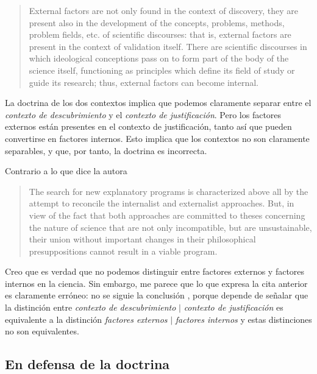 \begin{quote}

	External factors are not only found in the context of discovery, they are present also in the development of the concepts, problems, methods, problem fields, etc. of scientific discourses: that is, external factors are present in the context of validation itself.
	There are scientific discourses in which ideological conceptions pass on to form part of the body of the science itself, functioning as principles which define its field of study or guide its research; thus, external factors can become internal.

\end{quote}

La doctrina de los dos contextos implica que podemos claramente separar entre el \emph{contexto de descubrimiento} y el \emph{contexto de justificación}.
Pero los factores externos están presentes en el contexto de justificación, tanto así que pueden convertirse en factores internos.
Esto implica que los contextos no son claramente separables, y que, por tanto, la doctrina es incorrecta.

Contrario a lo que dice la autora

\begin{quote}
	The search for new explanatory programs is characterized above all by the attempt to reconcile the internalist and externalist approaches. But, in view of the fact that both approaches are committed to theses concerning the nature of science that are not only incompatible, but are unsustainable, their union without important changes in their philosophical presuppositions cannot result in a viable program. \parencite[p. 79]{Yturbe1995}
\end{quote}

Creo que es verdad que no podemos distinguir entre factores externos y factores internos en la ciencia.
Sin embargo, me parece que lo que expresa la cita anterior es claramente erróneo: no se siguie la conclusión , porque depende de señalar que la distinción entre  \emph{contexto de descubrimiento} $|$ \emph{contexto de justificación} es equivalente a la distinción \emph{factores externos} $|$ \emph{factores internos} y estas distinciones no son equivalentes.



\subsection{En defensa de la doctrina}

